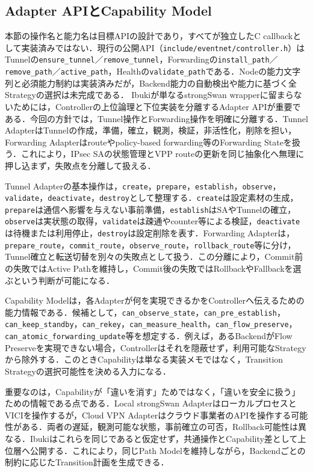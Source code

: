 \documentclass[11pt,a4paper,twoside]{ltjsarticle}
\begin{document}
\subsection{Adapter APIとCapability Model}
本節の操作名と能力名は目標APIの設計であり，すべてが独立したC callbackとして実装済みではない．現行の公開API（\texttt{include/eventnet/controller.h}）はTunnelの\texttt{ensure\_tunnel}／\texttt{remove\_tunnel}，Forwardingの\texttt{install\_path}／\texttt{remove\_path}／\texttt{active\_path}，Healthの\texttt{validate\_path}である．Nodeの能力文字列と必須能力制約は実装済みだが，Backend能力の自動検出や能力に基づく全Strategyの選択は未完成である．
Ibukiが単なるstrongSwan wrapperに留まらないためには，Controllerの上位論理と下位実装を分離するAdapter APIが重要である．今回の方針では，Tunnel操作とForwarding操作を明確に分離する．Tunnel AdapterはTunnelの作成，準備，確立，観測，検証，非活性化，削除を担い，Forwarding Adapterはrouteやpolicy-based forwarding等のForwarding Stateを扱う．これにより，IPsec SAの状態管理とVPP routeの更新を同じ抽象化へ無理に押し込まず，失敗点を分離して扱える．

Tunnel Adapterの基本操作は，\texttt{create}，\texttt{prepare}，\texttt{establish}，\texttt{observe}，\texttt{validate}，\texttt{deactivate}，\texttt{destroy}として整理する．\texttt{create}は設定素材の生成，\texttt{prepare}は通信へ影響を与えない事前準備，\texttt{establish}はSAやTunnelの確立，\texttt{observe}は実状態の取得，\texttt{validate}は疎通やcounter等による検証，\texttt{deactivate}は待機または利用停止，\texttt{destroy}は設定削除を表す．Forwarding Adapterは，\texttt{prepare\_route}，\texttt{commit\_route}，\texttt{observe\_route}，\texttt{rollback\_route}等に分け，Tunnel確立と転送切替を別々の失敗点として扱う．この分離により，Commit前の失敗ではActive Pathを維持し，Commit後の失敗ではRollbackやFallbackを選ぶという判断が可能になる．

Capability Modelは，各Adapterが何を実現できるかをControllerへ伝えるための能力情報である．候補として，\texttt{can\_observe\_state}，\texttt{can\_pre\_establish}，\texttt{can\_keep\_standby}，\texttt{can\_rekey}，\texttt{can\_measure\_health}，\texttt{can\_flow\_preserve}，\texttt{can\_atomic\_forwarding\_update}等を想定する．例えば，あるBackendがFlow Preserveを実現できない場合，Controllerはそれを隠蔽せず，利用可能なStrategyから除外する．このときCapabilityは単なる実装メモではなく，Transition Strategyの選択可能性を決める入力になる．

重要なのは，Capabilityが「違いを消す」ためではなく，「違いを安全に扱う」ための情報である点である．Local strongSwan AdapterはローカルプロセスとVICIを操作するが，Cloud VPN Adapterはクラウド事業者のAPIを操作する可能性がある．両者の遅延，観測可能な状態，事前確立の可否，Rollback可能性は異なる．Ibukiはこれらを同じであると仮定せず，共通操作とCapability差として上位層へ公開する．これにより，同じPath Modelを維持しながら，Backendごとの制約に応じたTransition計画を生成できる．
\end{document}
